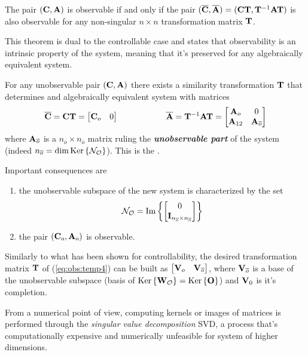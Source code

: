 	\begin{theorem}
		The pair $(\mathbf{C},\mathbf{A})$ is observable if and only if the pair $(\overline {\mathbf{C}},\overline {\mathbf{A}}) = (\mathbf{C}\mathbf{T}, \mathbf{T}^{-1}\mathbf{A} \mathbf{T})$ is also observable for any non-singular $n\times n$ transformation matrix $\mathbf{T}$.
	\end{theorem}
	This theorem is dual to the controllable case and states that observability is an intrinsic property of the system, meaning that it's preserved for any algebraically equivalent system.
	
	\begin{theorem}
		For any unobservable pair $(\mathbf{C},\mathbf{A})$ there exists a similarity transformation $\mathbf{T}$ that determines and algebraically equivalent system with matrices
		\begin{equation} \label{eq:obs:temp4}
			\overline {\mathbf{C}} = \mathbf{C}\mathbf{T}= \begin{bmatrix} \mathbf{C}_o & 0 \end{bmatrix} \hspace{2cm} \overline {\mathbf{A}} = \mathbf{T}^{-1}\mathbf{A}\mathbf{T} = \begin{bmatrix} \mathbf{A}_o & 0 \\ \mathbf{A}_{12} & \mathbf{A}_{\overline o} \end{bmatrix}
		\end{equation} 
		where $\mathbf{A}_{\overline o}$ is a $n_{\overline o} \times n_{\overline o}$ matrix ruling the \textbf{\textit{unobservable part}} of the system (indeed $n_{\overline o} = \dim \textrm{Ker}\left\{\mathcal{N_O}\right\}$). This is the .
	\end{theorem}
	Important consequences are
	\begin{enumerate}[\itshape i)]
		\item the unobservable subspace of the new system is characterized by the set
		\begin{equation}
			\mathcal{N_O} =  \textrm{Im}\left\{\begin{bmatrix} 0 \\ \mathbf{I}_{n_{\overline o} \times n_{\overline o} } \end{bmatrix}\right\}
		\end{equation}
		\item the pair $(\mathbf{C}_o,\mathbf{A}_o)$ is observable.
	\end{enumerate}
	Similarly to what has been shown for controllability, the desired transformation matrix $\mathbf{T}$ of (\ref{eq:obs:temp4}) can be built as $\begin{bmatrix} \mathbf{V}_o & \mathbf{V}_{\overline o} \end{bmatrix}$, where $\mathbf{V}_{\overline o}$ is a base of the unobservable subspace (basis of $\textrm{Ker}\left\{\mathbf{W}_{\mathcal O}\right\} = \textrm{Ker}\left\{\mathbf{O}\right\}$) and $\mathbf{V}_0$ is it's completion.
	
	\begin{note}
		From a numerical point of view, computing kernels or images of matrices is performed through the \textit{singular value decomposition} SVD, a process that's computationally expensive and numerically unfeasible for system of higher dimensions.
	\end{note}
	
	
	
	
	
	
	
	
	
	
	
	
	
	
	
	
	
	
	
	
	
	
	
	
	
	